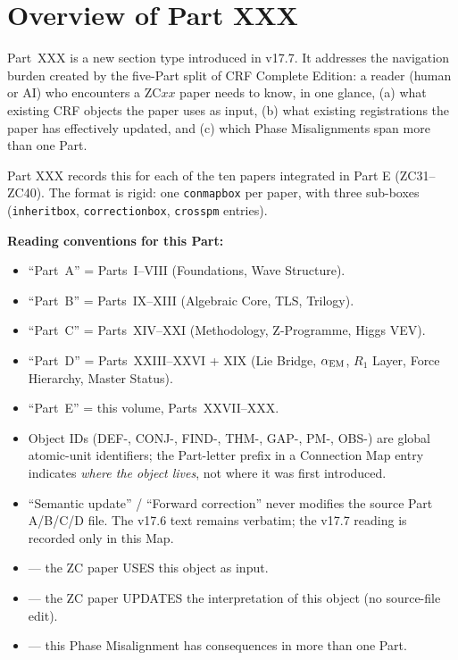 \documentclass[12pt, a4paper]{article}
\begin{document}
\section*{Overview of Part XXX}

\sloppy
Part~XXX is a new section type introduced in v17.7. It addresses the
navigation burden created by the five-Part split of CRF Complete
Edition: a reader (human or AI) who encounters a ZC$xx$ paper needs
to know, in one glance, (a) what existing CRF objects the paper uses
as input, (b) what existing registrations the paper has effectively
updated, and (c) which Phase Misalignments span more than one Part.

Part XXX records this for each of the ten papers integrated in Part E
(ZC31--ZC40). The format is rigid: one \texttt{conmapbox} per paper,
with three sub-boxes (\texttt{inheritbox}, \texttt{correctionbox},
\texttt{crosspm} entries).

\bigskip

\noindent\textbf{Reading conventions for this Part:}

\begin{itemize}[leftmargin=2em]
  \item ``Part~A'' = Parts~I--VIII (Foundations, Wave Structure).
  \item ``Part~B'' = Parts~IX--XIII (Algebraic Core, TLS, Trilogy).
  \item ``Part~C'' = Parts~XIV--XXI (Methodology, Z-Programme, Higgs VEV).
  \item ``Part~D'' = Parts~XXIII--XXVI + XIX
        (Lie Bridge, $\alpha_{\rm EM}$, $R_1$ Layer, Force Hierarchy,
        Master Status).
  \item ``Part~E'' = this volume, Parts~XXVII--XXX.
  \item Object IDs (DEF-, CONJ-, FIND-, THM-, GAP-, PM-, OBS-) are
        global atomic-unit identifiers; the Part-letter prefix in
        a Connection Map entry indicates \emph{where the object lives},
        not where it was first introduced.
  \item ``Semantic update'' / ``Forward correction'' never modifies
        the source Part A/B/C/D file. The v17.6 text remains verbatim;
        the v17.7 reading is recorded only in this Map.
\end{itemize}

\bigskip

\begin{conmapbox}[title={Map Legend}]
\sloppy
\begin{itemize}[noitemsep,leftmargin=1.5em]
  \item {} --- the ZC paper
    USES this object as input.
  \item {} --- the ZC paper
    UPDATES the interpretation of this object (no source-file edit).
  \item {} --- this Phase Misalignment
    has consequences in more than one Part.
\end{itemize}
\end{conmapbox}
\end{document}
